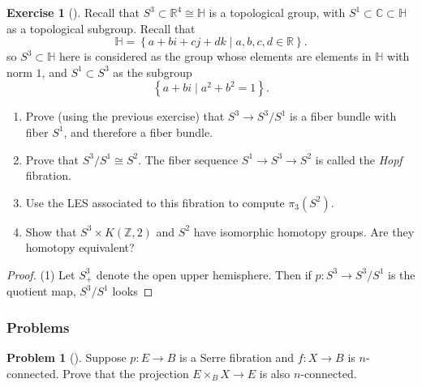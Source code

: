 \documentclass[reqno]{amsart}
\theoremstyle{definition}
\newtheorem{exercise}[theorem]{Exercise}
\newtheorem{problem}[theorem]{Problem}
\theoremstyle{remark}
\begin{document}
\begin{exercise}[]
    Recall that $S^3 \subset \mathbb{R}^{4} \cong
    \mathbb{H} $ is a topological group, with
    $S^{1} \subset \mathbb{C} \subset \mathbb{H}$ as a topological
    subgroup.
    Recall that
    \[
    \mathbb{H} = \left\{ 
    a + bi + cj + dk  \mid a,b,c,d \in \mathbb{R} \right\} .
    \] 
    so $S^{3} \subset \mathbb{H}$ here
    is considered as the group whose
    elements are elements in $\mathbb{H}$ with
    norm $1$, and
    $S^{1} \subset S^3$ as the subgroup
    \[
    \left\{ a+bi  \mid  a^2+ b^2 = 1 \right\} .
    \] 
    \begin{enumerate}
        \item Prove (using the previous exercise)
            that $S^3 \to S^3 / S^{1}$ is a fiber bundle
            with fiber $S^{1}$, and therefore a fiber bundle.
        \item Prove that $S^3 / S^{1} \cong S^2$. The
            fiber sequence $S^{1} \to S^3 \to S^2$ is
            called the \textit{Hopf} fibration.
        \item Use the LES associated to this fibration
            to compute $\pi_3 (S^2)$.
        \item Show that $S^3 \times K(\mathbb{Z},2)$ and
            $S^2$ have isomorphic homotopy groups. Are
            they homotopy equivalent?
    \end{enumerate}
\end{exercise}



\begin{proof}
    (1) Let
    $S_+^{3}$ denote the open upper hemisphere.
    Then if $p \colon S^3 \to S^3 / S^{1}$ is the quotient map,
    $S^3 / S^{1}$ looks 
\end{proof}




\newpage

\subsubsection{Problems}


    \begin{problem}[]
        Suppose $p \colon E \to B$ is a Serre
        fibration and $f \colon X \to B$ is
        $n$-connected. Prove that the projection
        $E \times_B X \to E$ is also $n$-connected.
    \end{problem}
\end{document}
